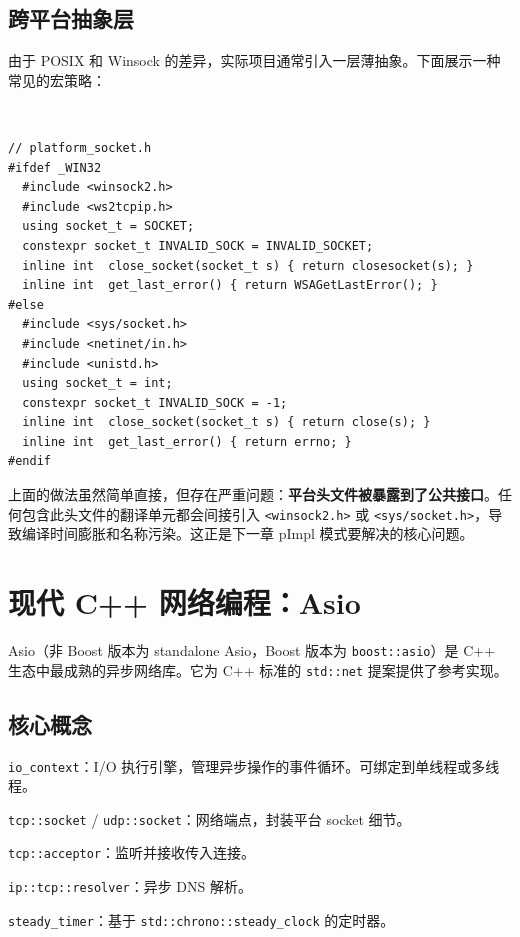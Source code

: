 \documentclass[12pt,a4paper,fontset=fandol]{ctexbook}
\newcommand{\cpp}[1]{C++#1}
\newcommand{\Tp}[1]{\texttt{#1}}
\newcommand{\cpplabel}{%
  \noindent\begin{tcolorbox}[sharp corners,colback=algheadbg,colframe=algheadbg,
    left=6pt,right=6pt,top=2pt,bottom=2pt,boxrule=0pt]
  \textcolor{white}{\small\bfseries\sffamily C++}\end{tcolorbox}%
}
\begin{document}
\section{跨平台抽象层}

由于 POSIX 和 Winsock 的差异，实际项目通常引入一层薄抽象。下面展示一种常见的宏策略：

\cpplabel
\begin{lstlisting}
// platform_socket.h
#ifdef _WIN32
  #include <winsock2.h>
  #include <ws2tcpip.h>
  using socket_t = SOCKET;
  constexpr socket_t INVALID_SOCK = INVALID_SOCKET;
  inline int  close_socket(socket_t s) { return closesocket(s); }
  inline int  get_last_error() { return WSAGetLastError(); }
#else
  #include <sys/socket.h>
  #include <netinet/in.h>
  #include <unistd.h>
  using socket_t = int;
  constexpr socket_t INVALID_SOCK = -1;
  inline int  close_socket(socket_t s) { return close(s); }
  inline int  get_last_error() { return errno; }
#endif
\end{lstlisting}

\begin{note}[title=这种宏策略的局限性]
上面的做法虽然简单直接，但存在严重问题：\textbf{平台头文件被暴露到了公共接口}。任何包含此头文件的翻译单元都会间接引入 \Tp{<winsock2.h>} 或 \Tp{<sys/socket.h>}，导致编译时间膨胀和名称污染。这正是下一章 pImpl 模式要解决的核心问题。
\end{note}

\chapter{现代 C++ 网络编程：Asio}

Asio（非 Boost 版本为 standalone Asio，Boost 版本为 \Tp{boost::asio}）是 C++ 生态中最成熟的异步网络库。它为 \cpp{} 标准的 \Tp{std::net} 提案提供了参考实现。

\section{核心概念}

\begin{guideline}[title=Asio 核心组件]
\Tp{io\_context}：I/O 执行引擎，管理异步操作的事件循环。可绑定到单线程或多线程。

\Tp{tcp::socket} / \Tp{udp::socket}：网络端点，封装平台 socket 细节。

\Tp{tcp::acceptor}：监听并接收传入连接。

\Tp{ip::tcp::resolver}：异步 DNS 解析。

\Tp{steady\_timer}：基于 \Tp{std::chrono::steady\_clock} 的定时器。
\end{guideline}
\end{document}
